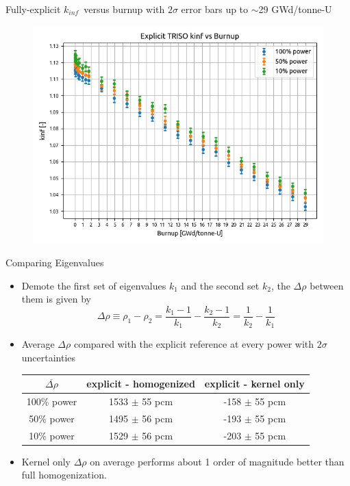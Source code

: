 \documentclass[9pt,t,aspectratio=169]{beamer}
\newcommand{\kinf}{$k_{inf}$}
\begin{document}
\begin{frame}{Fully-explicit \kinf~versus burnup with $2\sigma$ error bars up to $\sim$29 GWd/tonne-U}
    \begin{figure}
        \vspace*{-0.4cm}
        \centering
            \includegraphics[height=0.9\textheight]{figures/expl_kinf_vs_bu.png}
        \label{fig:kinf_full_explicit_results}
    \end{figure}
\end{frame}

\begin{frame}{Comparing Eigenvalues}
    \begin{itemize}
        \item Demote the first set of eigenvalues $k_ 1$ and the second set $k_2$, the $\Delta \rho$ between them is given by
        \begin{equation}
            \Delta \rho \equiv
            \rho_1 - \rho_2 =
            \frac{k_1-1}{k_1} - \frac{k_2 - 1 }{k_2} =
            \frac{1}{k_2} - \frac{1}{k_1}
        \end{equation}
        \item Average $\Delta \rho$ compared with the explicit reference at every power with $2\sigma$ uncertainties
        \begin{table}[!h]
            \centering
            \begin{tabular}{c|c|c}
            $\overline{\Delta \rho}$ & explicit - homogenized & explicit - kernel only \\ \hline
            100\% power & 1533 $\pm$ 55 pcm &  -158 $\pm$ 55 pcm \\
            50\% power & 1495 $\pm$ 56 pcm & -193 $\pm$ 55 pcm\\
            10\% power & 1529 $\pm$ 56 pcm  & -203 $\pm$ 55 pcm
            \end{tabular}
            \label{tab:average_pcms}
        \end{table}
    \item Kernel only $\Delta \rho$ on average performs about 1 order of magnitude better than full homogenization.
    \end{itemize}
\end{frame}
\end{document}
